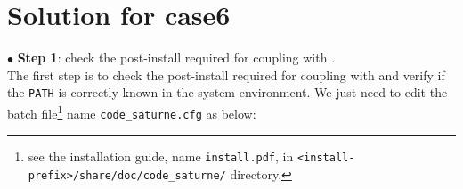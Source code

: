 
%
%
%
%


\section{Solution for case6}

$\bullet$ {\bf Step 1}: check the post-install required for coupling \CS with \syrthes.\\
The first step is to check the post-install required for coupling with \syrthes and verify
if the \syrthes \texttt{PATH} is correctly known in the system environment. We just need to
edit the batch file\footnote{see the installation guide, name \texttt{install.pdf}, in
\texttt{<install-prefix>/share/doc/code\_saturne/} directory.} name \texttt{code\_saturne.cfg}
as below: \\

